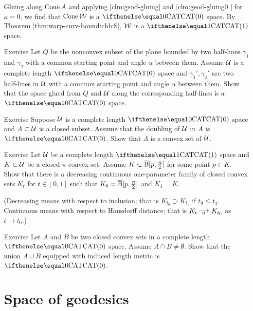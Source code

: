 Gluing along $\mathop{\rm Cone}\nolimits A$ and applying \ref{clm:geod-gluing} and \ref{clm:geod-gluing0 } for $\kappa=0$, we find that 
$\mathop{\rm Cone}\nolimits\mathcal{W}$ is a $\CAT0$ space.  By Theorem \ref{thm:warp-curv-bound:cbb:S}, $\mathcal{W}$ is a $\CAT1$ space.
\qeds

\begin{thm}{Exercise}\label{ex:two-rays}
Let $Q$ be the nonconvex subset of the plane bounded by two half-lines $\gamma_1$ and $\gamma_2$ with a common starting point and angle $\alpha$ between them.
Assume $\mathcal{U}$ is a complete length $\CAT0$ space and $\gamma_1',\gamma_2'$ are two half-lines in $\mathcal{U}$ with a common
starting point and angle $\alpha$ between them.
Show that the space glued from $Q$ and $\mathcal{U}$ along the corresponding half-lines is a $\CAT{0}$ space.
\end{thm}

\begin{thm}{Exercise}\label{ex:reshetnyak-doubling}
Suppose $\mathcal{U}$ is a complete length $\CAT0$ space and $A\subset \spc{U}$ is a closed subset.
Assume that the doubling of $\mathcal{U}$ in $A$ is $\CAT0$. 
Show that $A$ is a convex set of $\mathcal{U}$.
\end{thm}

\begin{thm}{Exercise}\label{ex:glue-spherical-suspension}
Let  $\mathcal{U}$ be a complete length $\CAT1$ space and $K\subset \spc{U}$ be a closed $\pi$-convex set.
Assume $K\subset \cBall[p,\tfrac\pi2]$ for some point $p\in K$.
Show that there is a decreasing continuous one-parameter family of closed convex sets $K_t$ for $t\in[0,1]$ such that $K_0=\overline{\mathrm{B}}{}[p,\tfrac{\uppi}2]$ and $K_1=K$.

(Decreasing means with respect to inclusion; that is $K_{t_0}\supset K_{t_1}$ if $t_0\le t_1$.
Continuous means with respect to Hausdorff distance; that is $K_t\Hto K_{t_0}$ as $t\to t_0$.)
\end{thm}


\begin{thm}{Exercise}\label{ex:AUB}
Let $A$ and $B$ be two closed convex sets in a complete length $\CAT0$ space.
Assume $A\cap B\ne\emptyset$.
Show that the union $A\cup B$ equipped with induced length metric is $\CAT0$. 
\end{thm}


\section{Space of geodesics}\label{sec:geod-space}

